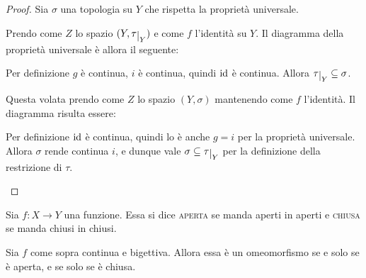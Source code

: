 \documentclass{article}
\begin{document}
\begin{proof}
    Sia $\sigma$ una topologia su $Y$ che rispetta la propriet\`a universale.
    \begin{nlist}
        \item Prendo come $Z$ lo spazio $(Y, \tau\restrict{Y})$ e come $f$
        l'identità su $Y$. Il diagramma della proprietà universale \`e allora il
        seguente:

        \begin{center}\end{center}

        Per definizione $g$ \`e continua, $i$ \`e continua, quindi $\operatorname{id}$ \`e
        continua. Allora $\tau\restrict{Y} \subseteq \sigma$.

        \item Questa volata prendo come $Z$ lo spazio $(Y, \sigma)$ mantenendo
        come $f$ l'identità. Il diagramma risulta essere:

        \begin{center}\end{center}

        Per definizione $\operatorname{id}$ \`e continua, quindi lo \`e anche $g=i$ per la
        propriet\`a universale. Allora $\sigma$ rende continua $i$, e dunque
        vale $\sigma \subseteq \tau\restrict{Y}$ per la definizione della
        restrizione di $\tau$.
    \end{nlist}
\end{proof}
\begin{defn}
    Sia $f:X\longrightarrow Y$ una funzione. Essa si dice \textsc{aperta} se
    manda aperti in aperti e \textsc{chiusa} se manda chiusi in chiusi.
\end{defn}

\begin{oss}
    Sia $f$ come sopra continua e bigettiva. Allora essa \`e un omeomorfismo se
    e solo se \`e aperta, e se solo se \`e chiusa.
\end{oss}
\end{document}
